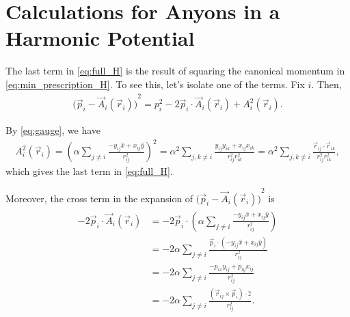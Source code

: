 \chapter{Calculations for Anyons in a Harmonic Potential}\label{ch:Appendix_multi_anyon}


The last term in \cref{eq:full_H} is the result of squaring the canonical momentum in \cref{eq:min_prescription_H}. To see this, let's isolate one of the terms. Fix $i$. Then,
\begin{align}
    {\bigl(\vec{p}_i - \vec{A}_i(\vec{r}_i)\bigr)}^2 = {p}_i^{2} - 2\vec{p}_i\cdot\vec{A}_i(\vec{r}_i) + {A}_i^{2}(\vec{r}_i).
\end{align}

By \cref{eq:gauge}, we have
\begin{align}
    {A}_i^{2}(\vec{r}_i) = {\left( \alpha\sum_{j\neq i}\frac{-y_{ij}\hat{x} + x_{ij}\hat{y}}{r_{ij}^2} \right)}^2 = \alpha^2\sum_{j,k\neq i}\frac{y_{ij}y_{ik} + x_{ij}x_{ik}}{r_{ij}^2r_{ik}^2} = \alpha^2\sum_{j,k\neq i}\frac{\vec{r}_{ij}\cdot\vec{r}_{ik}}{r_{ij}^2r_{ik}^2},
\end{align}
which gives the last term in \cref{eq:full_H}.

Moreover, the cross term in the expansion of ${\bigl(\vec{p}_i - \vec{A}_i(\vec{r}_i)\bigr)}^2$ is
\begin{align}
    \begin{split}        
    -2\vec{p}_i\cdot\vec{A}_i(\vec{r}_i) &= -2\vec{p}_i\cdot\left( \alpha\sum_{j\neq i}\frac{-y_{ij}\hat{x} + x_{ij}\hat{y}}{r_{ij}^2} \right) \\
    &= -2\alpha\sum_{j\neq i}\frac{\vec{p}_i\cdot\left( -y_{ij}\hat{x} + x_{ij}\hat{y} \right)}{r_{ij}^2} \\
    &= -2\alpha\sum_{j\neq i}\frac{-p_{ix}y_{ij} + p_{iy}x_{ij}}{r_{ij}^2} \\
    &= -2\alpha\sum_{j\neq i}\frac{(\vec{r}_{ij}\times\vec{p}_i)\cdot\hat{z}}{r_{ij}^2}.
    \end{split}
\end{align}

